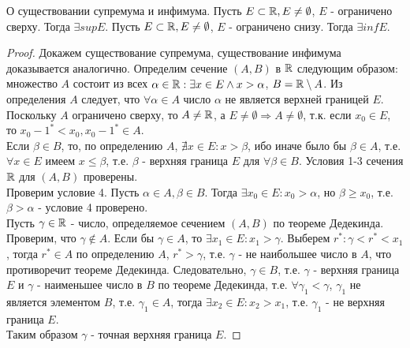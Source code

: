 \documentclass[main]{subfiles}
\begin{document}
\begin{theorem}
    О существовании супремума и инфимума.
    Пусть $E \subset \mathbb{R}, E \neq \emptyset$, $E$ - ограничено сверху.
    Тогда $\exists sup E$.
    Пусть $E \subset \mathbb{R}, E \neq \emptyset$, $E$ - ограничено снизу.
    Тогда $\exists inf E$.
\end{theorem}
\begin{proof}
    Докажем существование супремума, существование инфимума доказывается 
    аналогично. Определим сечение $(A, B)$ в $\mathbb{R}$ следующим образом: 
    множество $A$ состоит из всех $\alpha \in \mathbb{R} : \exists x \in E \wedge
    x > \alpha$, $B = \mathbb{R} \setminus A$. 
    Из определения $A$ следует, что $\forall \alpha \in A$ число $\alpha$
    не является верхней границей $E$. Поскольку $A$ ограничено сверху, то 
    $A \neq \mathbb{R}$, а $E \neq \emptyset \Rightarrow A \neq \emptyset$, т.к. 
    если $x_0 \in E$, то $x_0 - 1^* < x_0, x_0 - 1^* \in A$. \\
    Если $\beta \in B$, то, по определению $A$, $\nexists x \in E : x > \beta$,
    ибо иначе было бы $\beta \in A$, т.е. $\forall x \in E$ имеем 
    $x \leq \beta$, т.е. $\beta$ - верхняя граница $E$ для $\forall \beta \in B$.
    Условия 1-3 сечения $\mathbb{R}$ для $(A, B)$ проверены. \\
    Проверим условие 4. Пусть $\alpha \in A, \beta \in B$. Тогда 
    $\exists x_0 \in E : x_0 > \alpha$, но $\beta \geq x_0$, т.е. 
    $\beta > \alpha$ - условие 4 проверено. \\
    Пусть $\gamma \in \mathbb{R}$ - число, определяемое сечением $(A, B)$ по теореме
    Дедекинда. Проверим, что $\gamma \notin A$. Если бы $\gamma \in A$, то 
    $\exists x_1 \in E : x_1 > \gamma$. Выберем $r^* : \gamma < r^* < x_1$,
    тогда $r^* \in A$ по определению $A$, $r^* > \gamma$, т.е. $\gamma$ - 
    не наибольшее число в $A$, что противоречит теореме Дедекинда. 
    Следовательно, $\gamma \in B$, т.е. $\gamma$ - верхняя граница $E$ и 
    $\gamma$ - наименьшее число в $B$ по теореме Дедекинда, т.е. 
    $\forall \gamma_1 < \gamma$, $\gamma_1$ не является элементом $B$, т.е. 
    $\gamma_1 \in A$, тогда $\exists x_2 \in E : x_2 > x_1$, т.е. $\gamma_1$ -
    не верхняя граница $E$. \\
    Таким образом $\gamma$ - точная верхняя граница $E$.
\end{proof}
\end{document}

